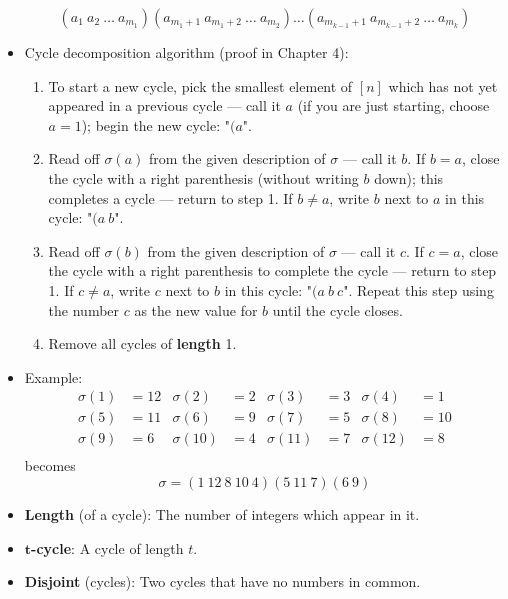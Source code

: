 \documentclass[../notes.tex]{subfiles}
\begin{document}
\begin{itemize}
\begin{equation*}
        (a_1\ a_2\ \dots\ a_{m_1})(a_{m_1+1}\ a_{m_1+2}\ \dots\ a_{m_2})\dots(a_{m_{k-1}+1}\ a_{m_{k-1}+2}\ \dots\ a_{m_k})
    \end{equation*}
    \item Cycle decomposition algorithm (proof in Chapter 4):
    \begin{enumerate}
        \item To start a new cycle, pick the smallest element of $[n]$ which has not yet appeared in a previous cycle --- call it $a$ (if you are just starting, choose $a=1$); begin the new cycle: "$(a$".
        \item Read off $\sigma(a)$ from the given description of $\sigma$ --- call it $b$. If $b=a$, close the cycle with a right parenthesis (without writing $b$ down); this completes a cycle --- return to step 1. If $b\neq a$, write $b$ next to $a$ in this cycle: "$(a\ b$".
        \item Read off $\sigma(b)$ from the given description of $\sigma$ --- call it $c$. If $c=a$, close the cycle with a right parenthesis to complete the cycle --- return to step 1. If $c\neq a$, write $c$ next to $b$ in this cycle: "$(a\ b\ c$". Repeat this step using the number $c$ as the new value for $b$ until the cycle closes.
        \item Remove all cycles of \textbf{length} 1.
    \end{enumerate}
    \item Example:
    \begin{align*}
        \sigma(1) &= 12&
            \sigma(2) &= 2&
                \sigma(3) &= 3&
                    \sigma(4) &= 1\\
        \sigma(5) &= 11&
            \sigma(6) &= 9&
                \sigma(7) &= 5&
                    \sigma(8) &= 10\\
        \sigma(9) &= 6&
            \sigma(10) &= 4&
                \sigma(11) &= 7&
                    \sigma(12) &= 8\\
    \end{align*}
    becomes
    \begin{equation*}
        \sigma = (1\ 12\ 8\ 10\ 4)(5\ 11\ 7)(6\ 9)
    \end{equation*}
    \item \textbf{Length} (of a cycle): The number of integers which appear in it.
    \item \textbf{$\bm{t}$-cycle}: A cycle of length $t$.
    \item \textbf{Disjoint} (cycles): Two cycles that have no numbers in common.

\end{itemize}
\end{document}
